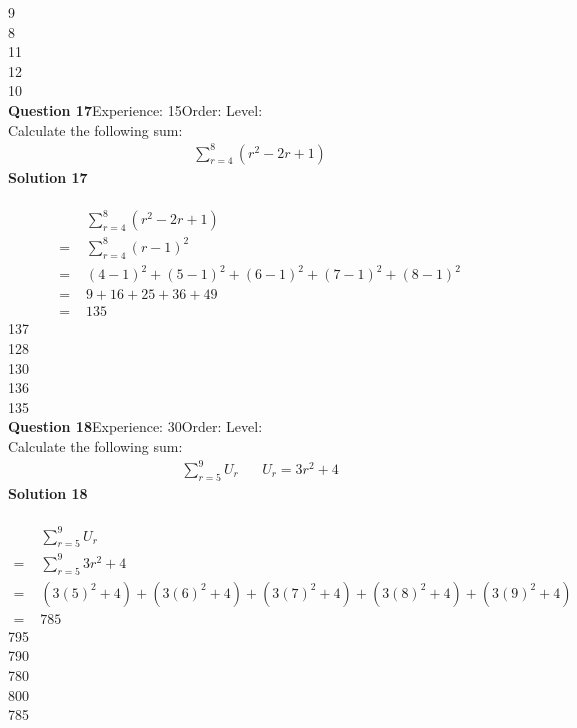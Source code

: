 \documentclass{article}
\begin{document}
9\\
8\\
11\\
12\\
10\\
\noindent\textbf{Question 17}\hspace{20pt}Experience: 15\hspace{20pt}Order: \hspace{20pt}Level: \\[2pt]
Calculate the following sum:
\begin{align*}
\sum_{r=4}^{8} (r^2-2r+1)
\end{align*}
\noindent\textbf{Solution 17}\\[2pt]
\\[-10pt]\begin{align*}
&\sum_{r=4}^{8} (r^2-2r+1)\\[2pt]
=\,\,&\sum_{r=4}^{8} (r-1)^2\\[2pt]
=\,\,&(4-1)^2+(5-1)^2+(6-1)^2+(7-1)^2+(8-1)^2\\[2pt]
=\,\,&9+16+25+36+49\\[2pt]
=\,\,&135
\end{align*}
137\\
128\\
130\\
136\\
135\\
\noindent\textbf{Question 18}\hspace{20pt}Experience: 30\hspace{20pt}Order: \hspace{20pt}Level: \\[2pt]
Calculate the following sum:
\begin{align*}
\sum_{r=5}^{9} U_r \hspace{20pt}U_r=3r^2+4
\end{align*}
\noindent\textbf{Solution 18}\\[2pt]
\\[-10pt]\begin{align*}
&\sum_{r=5}^{9} U_r\\[2pt]
=\,\,&\sum_{r=5}^{9} 3r^2+4\\[2pt]
=\,\,&(3(5)^2+4)+(3(6)^2+4)+(3(7)^2+4)+(3(8)^2+4)+(3(9)^2+4) \\[2pt]
=\,\,&785
\end{align*}
795\\
790\\
780\\
800\\
785\\
\end{document}
